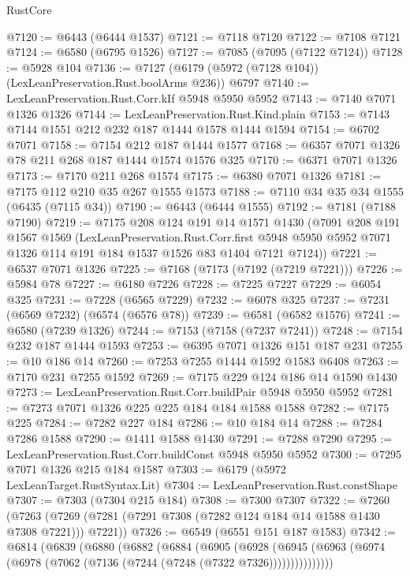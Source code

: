 \begin{lexlean}{RustCore}
\begin{coremodule}
{\begin{coremodule}
{{{{{{{{{{{{{{{{{{{{{{{{{{{{{{{{{{{{{{{{{{{{{@7120 := @6443 (@6444 @1537)
@7121 := @7118 @7120
@7122 := @7108 @7121
@7124 := @6580 (@6795 @1526)
@7127 := @7085 (@7095 (@7122 @7124))
@7128 := @5928 @104
@7136 := @7127 (@6179 (@5972 (@7128 @104)) (LexLeanPreservation.Rust.boolArms @236)) @6797
@7140 := LexLeanPreservation.Rust.Corr.kIf @5948 @5950 @5952
@7143 := @7140 @7071 @1326 @1326
@7144 := LexLeanPreservation.Rust.Kind.plain
@7153 := @7143 @7144 @1551 @212 @232 @187 @1444 @1578 @1444 @1594
@7154 := @6702 @7071
@7158 := @7154 @212 @187 @1444 @1577
@7168 := @6357 @7071 @1326 @78 @211 @268 @187 @1444 @1574 @1576 @325
@7170 := @6371 @7071 @1326
@7173 := @7170 @211 @268 @1574
@7175 := @6380 @7071 @1326
@7181 := @7175 @112 @210 @35 @267 @1555 @1573
@7188 := @7110 @34 @35 @34 @1555 (@6435 (@7115 @34))
@7190 := @6443 (@6444 @1555)
@7192 := @7181 (@7188 @7190)
@7219 := @7175
    @208
    @124
    @191
    @14
    @1571
    @1430
    (@7091
      @208
      @191
      @1567
      @1569
      (LexLeanPreservation.Rust.Corr.first
        @5948
        @5950
        @5952
        @7071
        @1326
        @114
        @191
        @184
        @1537
        @1526
        @83
        @1404
        @7121
        @7124))
@7221 := @6537 @7071 @1326
@7225 := @7168 (@7173 (@7192 (@7219 @7221)))
@7226 := @5984 @78
@7227 := @6180 @7226
@7228 := @7225 @7227
@7229 := @6054 @325
@7231 := @7228 (@6565 @7229)
@7232 := @6078 @325
@7237 := @7231 (@6569 @7232) (@6574 (@6576 @78))
@7239 := @6581 (@6582 @1576)
@7241 := @6580 (@7239 @1326)
@7244 := @7153 (@7158 (@7237 @7241))
@7248 := @7154 @232 @187 @1444 @1593
@7253 := @6395 @7071 @1326 @151 @187 @231
@7255 := @10 @186 @14
@7260 := @7253 @7255 @1444 @1592 @1583 @6408
@7263 := @7170 @231 @7255 @1592
@7269 := @7175 @229 @124 @186 @14 @1590 @1430
@7273 := LexLeanPreservation.Rust.Corr.buildPair @5948 @5950 @5952
@7281 := @7273 @7071 @1326 @225 @225 @184 @184 @1588 @1588
@7282 := @7175 @225
@7284 := @7282 @227 @184
@7286 := @10 @184 @14
@7288 := @7284 @7286 @1588
@7290 := @1411 @1588 @1430
@7291 := @7288 @7290
@7295 := LexLeanPreservation.Rust.Corr.buildConst @5948 @5950 @5952
@7300 := @7295 @7071 @1326 @215 @184 @1587
@7303 := @6179 (@5972 LexLeanTarget.RustSyntax.Lit)
@7304 := LexLeanPreservation.Rust.constShape
@7307 := @7303 (@7304 @215 @184)
@7308 := @7300 @7307
@7322 := @7260
    (@7263 (@7269 (@7281 (@7291 @7308 (@7282 @124 @184 @14 @1588 @1430 @7308 @7221))) @7221))
@7326 := @6549 (@6551 @151 @187 @1583)
@7342 := @6814
    (@6839
      (@6880
        (@6882
          (@6884
            (@6905
              (@6928
                (@6945 (@6963 (@6974 (@6978 (@7062 (@7136 (@7244 (@7248 (@7322 @7326)))))))))))))))
}}}}}}}}}}}}}}}}}}}}}}}}}}}}}}}}}}}}}}}}}}}}}
\end{coremodule}}
\end{coremodule}
\end{lexlean}
